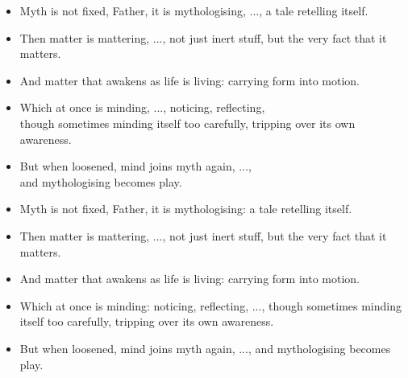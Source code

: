 \begin{itemize}[leftmargin=2cm,labelsep=1em]
    \item[\textbf{Eleanor:}] 
    Myth is not fixed, Father, it is mythologising, ...,  a tale retelling itself.

    \item[\textbf{Priest:}] 
    Then matter is mattering, ...,  not just inert stuff, but the very fact that it matters.

    \item[\textbf{Eleanor:}] 
    And matter that awakens as life is living: carrying form into motion.

    \item[\textbf{Priest:}] 
    Which at once is minding, ..., noticing, reflecting, \\
    though sometimes minding itself too carefully,
    tripping over its own awareness.

    \item[\textbf{Eleanor:}] 
    But when loosened, mind joins myth again, ...,  \\
    and mythologising becomes play.
\end{itemize}
\begin{itemize}[leftmargin=2cm,labelsep=1em]
    \item[\textbf{Eleanor:}] 
    Myth is not fixed, Father, it is mythologising: a tale retelling itself.

    \item[\textbf{Priest:}] 
    Then matter is mattering, ..., not just inert stuff, but the very fact that it matters.

    \item[\textbf{Eleanor:}] 
    And matter that awakens as life is living:  carrying form into motion.

    \item[\textbf{Priest:}] 
    Which at once is minding: noticing, reflecting, ..., 
    though sometimes minding itself too carefully, 
    tripping over its own awareness.

    \item[\textbf{Eleanor:}] 
    But when loosened, mind joins myth again, ...,  and mythologising becomes play.
\end{itemize}
